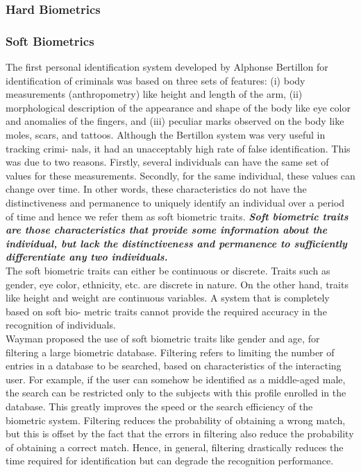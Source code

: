 \documentclass[12pt]{article}			%
\begin{document}
\subsubsection{ Hard Biometrics}

\subsubsection{ Soft Biometrics }
The first personal identification system developed by Alphonse Bertillon\cite{bert96} for identification of criminals was based
on three sets of features: (i) body measurements (anthropometry) like height and length of the arm, (ii) morphological
description of the appearance and shape of the body like eye color and anomalies of the fingers, and (iii) peculiar marks
observed on the body like moles, scars, and tattoos. Although the Bertillon system was very useful in tracking crimi-
nals, it had an unacceptably high rate of false identification. This was due to two reasons. Firstly, several individuals
can have the same set of values for these measurements. Secondly, for the same individual, these values can change
over time. In other words, these characteristics do not have the distinctiveness and permanence to uniquely identify
an individual over a period of time and hence we refer them as soft biometric traits. {\bf \it Soft biometric traits are those
characteristics that provide some information about the individual, but lack the distinctiveness and permanence to
sufficiently differentiate any two individuals.}\cite{Jain204}\\
The soft biometric traits can either be continuous or discrete. Traits such as gender, eye color, ethnicity, etc. are discrete in nature. On
the other hand, traits like height and weight are continuous variables. A system that is completely based on soft bio-
metric traits cannot provide the required accuracy in the recognition of individuals.\\
Wayman\cite{way97} proposed the use of soft biometric traits like gender and age, for filtering a large biometric database.
Filtering refers to limiting the number of entries in a database to be searched, based on characteristics of the interacting
user. For example, if the user can somehow be identified as a middle-aged male, the search can be restricted only to
the subjects with this profile enrolled in the database. This greatly improves the speed or the search efficiency of
the biometric system. Filtering reduces the probability of obtaining a wrong match, but this is offset by the fact that
the errors in filtering also reduce the probability of obtaining a correct match. Hence, in general, filtering drastically
reduces the time required for identification but can degrade the recognition performance.
\end{document}
